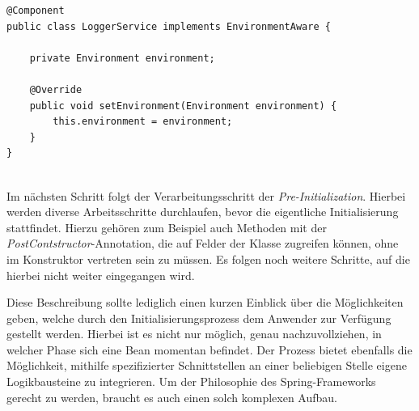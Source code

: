 \begin{lstlisting}[style=javaStyle,caption={Bean - EnvironmentAware \cite{bean-aware}},label=lst:bean-aware]
@Component
public class LoggerService implements EnvironmentAware {

	private Environment environment;

	@Override
	public void setEnvironment(Environment environment) {
		this.environment = environment;
	}
}


\end{lstlisting}
Im nächsten Schritt folgt der Verarbeitungsschritt der \emph{Pre-Initialization}. Hierbei werden diverse Arbeitsschritte durchlaufen, bevor die eigentliche Initialisierung stattfindet. Hierzu gehören zum Beispiel auch Methoden mit der \emph{PostContstructor}-Annotation, die auf Felder der Klasse zugreifen können, ohne im Konstruktor vertreten sein zu müssen. Es folgen noch weitere Schritte, auf die hierbei nicht weiter eingegangen wird. 

Diese Beschreibung sollte lediglich einen kurzen Einblick über die Möglichkeiten geben, welche durch den Initialisierungsprozess dem Anwender zur Verfügung gestellt werden. Hierbei ist es nicht nur möglich, genau nachzuvollziehen, in welcher Phase sich eine Bean momentan befindet. Der Prozess bietet ebenfalls die Möglichkeit, mithilfe spezifizierter Schnittstellen an einer beliebigen Stelle eigene Logikbausteine zu integrieren. Um der Philosophie des Spring-Frameworks gerecht zu werden, braucht es auch einen solch komplexen Aufbau. 


